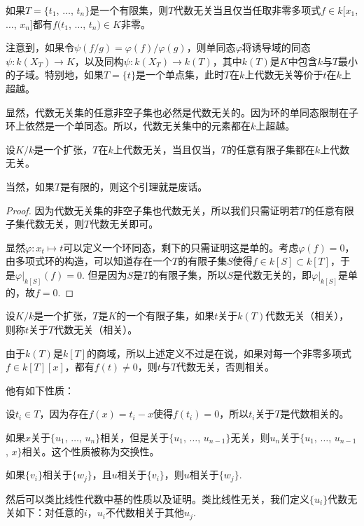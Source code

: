 如果$T=\{t_1$, $\dots$, $t_n\}$是一个有限集，则$T$代数无关当且仅当任取非零多项式$f\in k[x_1$, $\dots$, $x_n]$都有$f(t_1$, $\dots$, $t_n)\in K$非零。

注意到，如果令$\psi(f/g)=\varphi(f)/\varphi(g)$，则单同态$\varphi$将诱导域的同态$\psi:k(X_T)\to K$，以及同构$\psi:k(X_T)\to k(T)$，其中$k(T)$是$K$中包含$k$与$T$最小的子域。特别地，如果$T=\{t\}$是一个单点集，此时$T$在$k$上代数无关等价于$t$在$k$上超越。

显然，代数无关集的任意非空子集也必然是代数无关的。因为环的单同态限制在子环上依然是一个单同态。所以，代数无关集中的元素都在$k$上超越。

\begin{lem}
设$K/k$是一个扩张，$T$在$k$上代数无关，当且仅当，$T$的任意有限子集都在$k$上代数无关。
\end{lem}

当然，如果$T$是有限的，则这个引理就是废话。

\begin{proof}
因为代数无关集的非空子集也代数无关，所以我们只需证明若$T$的任意有限子集代数无关，则$T$代数无关即可。

显然$\varphi:x_t\mapsto t$可以定义一个环同态，剩下的只需证明这是单的。考虑$\varphi(f)=0$，由多项式环的构造，可以知道存在一个$T$的有限子集$S$使得$f\in k[S]\subset k[T]$，于是$\varphi|_{k[S]}(f)=0$. 但是因为$S$是$T$的有限子集，所以$S$是代数无关的，即$\varphi|_{k[S]}$是单的，故$f=0$.
\end{proof}

\begin{para}
设$K/k$是一个扩张，$T$是$K$的一个有限子集，如果$t$关于$k(T)$代数无关（相关），则称$t$关于$T$代数无关（相关）。
\end{para}

由于$k(T)$是$k[T]$的商域，所以上述定义不过是在说，如果对每一个非零多项式$f\in k[T][x]$，都有$f(t)\neq 0$，则$t$与$T$代数无关，否则相关。

他有如下性质：

 设$t_i\in T$，因为存在$f(x)=t_i-x$使得$f(t_i)=0$，所以$t_i$关于$T$是代数相关的。

 如果$x$关于$\{u_1$, $\dots$, $u_n\}$相关，但是关于$\{u_1$, $\dots$, $u_{n-1}\}$无关，则$u_n$关于$\{u_1$, $\dots$, $u_{n-1}$, $x\}$相关。这个性质被称为交换性。

 如果$\{v_i\}$相关于$\{w_j\}$，且$u$相关于$\{v_i\}$，则$u$相关于$\{w_j\}$.

然后可以类比线性代数中基的性质以及证明。类比线性无关，我们定义$\{u_i\}$代数无关如下：对任意的$i$，$u_i$不代数相关于其他$u_j$.

